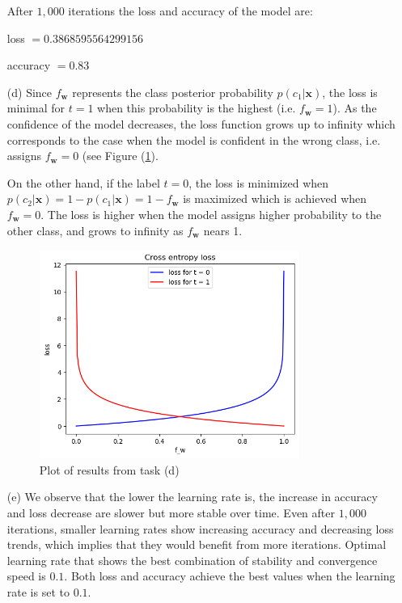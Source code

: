 \documentclass [a4paper, 11pt] {article}
\renewcommand{\v}[1]{\boldsymbol{#1}}
\begin{document}
\begin{enumerate}
\bigskip
\bigskip
\bigskip

After $1,000$ iterations the loss and accuracy of the model are:

	\qquad loss $= 0.3868595564299156$
	
	\qquad accuracy $= 0.83$



	
\item[(d)]
Since $f_{\v{w}}$ represents the class posterior probability $p(c_1|\v{x})$, the loss is minimal for $t = 1$ when this probability is the highest (i.e. $f_{\v{w}} = 1$). As the confidence of the model decreases, the loss function grows up to infinity which corresponds to the case when the model is confident in the wrong class, i.e. assigns $f_{\v{w}} = 0$ (see Figure (\ref{fig:1}).  

On the other hand, if the label $t = 0$, the loss is minimized when $p(c_2|\v{x}) = 1 - p(c_1|\v{x}) = 1 - f_{\v{w}}$ is maximized which is achieved when $f_{\v{w}} = 0$. The loss is higher when the model assigns higher probability to the other class, and grows to infinity as $f_{\v{w}}$ nears 1. 

\begin{figure}[!h]
	\centering
	\includegraphics[width=0.8\textwidth]{img/2_1_d.png}
	\caption{Plot of results from task (d)}
	\label{fig:1}
\end{figure}

\item[(e)]
We observe that the lower the learning rate is, the increase in accuracy and loss decrease are slower but more stable over time. Even after $1,000$ iterations, smaller learning rates show increasing accuracy and decreasing loss trends, which implies that they would benefit from more iterations. Optimal learning rate that shows the best combination of stability and convergence speed is $0.1$. Both loss and accuracy achieve the best values when the learning rate is set to $0.1$.  


\end{enumerate}
\end{document}
